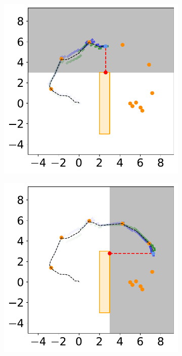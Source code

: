 \begin{figure}[H]
    \begin{subfigure}{0.35\textwidth}
        \centering
        \includegraphics[width=\textwidth]{figures/Simulations/sim_rrt/frame_4.pdf}
    \end{subfigure}%
    \hspace{1em}
    \begin{subfigure}{0.35\textwidth}
        \centering
        \includegraphics[width=\textwidth]{figures/Simulations/sim_rrt/frame_6.pdf}
    \end{subfigure}%
    

\end{figure}
